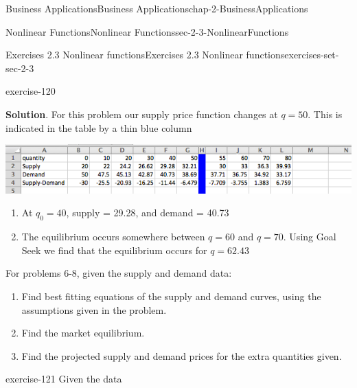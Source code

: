 \documentclass[oneside,10pt,]{book}
\numberwithin{equation}{section}
\begin{document}
\begin{chapterptx}{Business Applications}{}{Business Applications}{}{}{chap-2-BusinessApplications}
\begin{sectionptx}{Nonlinear Functions}{}{Nonlinear Functions}{}{}{sec-2-3-NonlinearFunctions}
\begin{exercises-subsection-numberless}{Exercises 2.3 Nonlinear functions}{}{Exercises 2.3 Nonlinear functions}{}{}{exercises-set-sec-2-3}
\begin{exercisegroup}
\begin{divisionexerciseeg}{5}{}{}{exercise-120}
\par\smallskip%
\noindent\textbf{Solution}.\hypertarget{solution-58}{}\quad%
\hypertarget{p-820}{}%
For this problem our supply price function changes at \(q = 50\). This is indicated in the table by a thin blue column%
\begin{sidebyside}{1}{0.1}{0.1}{0}%
\begin{sbspanel}{0.8}%
\includegraphics[width=1\linewidth]{images/sec2-3-sol5a.png}
\end{sbspanel}%
\end{sidebyside}%
\leavevmode%
\begin{enumerate}[label=(\alph*)]
\item\hypertarget{li-228}{}\hypertarget{p-821}{}%
At \(q_0=40\), supply = \textdollar{}29.28, and demand = \textdollar{}40.73%
\item\hypertarget{li-229}{}\hypertarget{p-822}{}%
The equilibrium occurs somewhere between \(q = 60\) and \(q = 70\). Using Goal Seek we find that the equilibrium occurs for \(q = 62.43\)%
\end{enumerate}
\end{divisionexerciseeg}%
\end{exercisegroup}
\par\medskip\noindent
\par\medskip\noindent%
\hypertarget{exercisegroup-10}{}%
\hypertarget{p-823}{}%
For problems 6-8, given the supply and demand data:%
\leavevmode%
\begin{enumerate}[label=(\alph*)]
\item\hypertarget{li-230}{}\hypertarget{p-824}{}%
Find best fitting equations of the supply and demand curves, using the assumptions given in the problem.%
\item\hypertarget{li-231}{}\hypertarget{p-825}{}%
Find the market equilibrium.%
\item\hypertarget{li-232}{}\hypertarget{p-826}{}%
Find the projected supply and demand prices for the extra quantities given.%
\end{enumerate}
\begin{exercisegroup}
\begin{divisionexerciseeg}{6}{}{}{exercise-121}%
\hypertarget{p-827}{}%
Given the data%
\begin{sidebyside}{1}{0}{0}{0}%

\end{sidebyside}
\end{divisionexerciseeg}
\end{exercisegroup}
\end{exercises-subsection-numberless}
\end{sectionptx}
\end{chapterptx}
\end{document}
